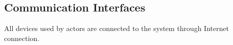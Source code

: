 \subsection{Communication Interfaces}

All devices used by actors are connected to the system through Internet connection.